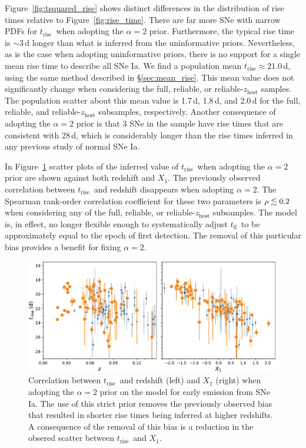 \documentclass[twocolumn]{./aastex63}
\newcommand{\tfl}{$t_\mathrm{fl}$}
\newcommand{\trise}{$t_\mathrm{rise}$}
\begin{document}
Figure~\ref{fig:tsquared_rise} shows distinct differences in the distribution of
rise times relative to Figure~\ref{fig:rise_time}. There are far more SNe with
narrow PDFs for \trise\ when adopting the $\alpha = 2$ prior. Furthermore, the
typical rise time is $\sim$3\,d longer than what is inferred from the
uninformative priors. Nevertheless, as is the case when adopting uninformative
priors, there is no support for a single mean rise time to describe all SNe Ia.
We find a population mean \trise\;$\approx 21.0$\,d, using the same method
described in \S\ref{sec:mean_rise}. This mean value does not significantly
change when considering the full, reliable, or reliable-$z_\mathrm{host}$
samples. The population scatter about this mean value is 1.7\,d, 1.8\,d, and
2.0\,d for the full, reliable, and reliable-$z_\mathrm{host}$ subsamples,
respectively. Another consequence of adopting the $\alpha = 2$ prior is that 3
SNe in the sample have rise times that are consistent with 28\,d, which is
considerably longer than the rise times inferred in any previous study of normal
SNe Ia.

In Figure~\ref{fig:tsquared_z_evolution} scatter plots of the inferred value of
\trise\ when adopting the $\alpha = 2$ prior are shown against both redshift and
$X_1$. The previously observed correlation between \trise\ and redshift
disappears when adopting $\alpha = 2$. The Spearman rank-order correlation
coefficient for these two parameters is $\rho \lesssim 0.2$ when considering any of
the full, reliable, or reliable-$z_\mathrm{host}$ subsamples. The model is, in
effect, no longer flexible enough to systematically adjust \tfl\ to be
approximately equal to the epoch of first detection. The removal of this
particular bias provides a benefit for fixing $\alpha = 2$.

\begin{figure}
    \centering
    \includegraphics[width=6in]{./figures/trise_z_tsquared.pdf}
    \caption{Correlation between \trise\ and redshift (left) and $X_1$ (right)
    when adopting the $\alpha = 2$ prior on the model for early emission from
    SNe Ia. The use of this strict prior removes the previously observed bias
    that resulted in shorter rise times being inferred at higher redshifts. A
    consequence of the removal of this bias is a reduction in the obsered
    scatter between \trise\ and $X_1$.}
    \label{fig:tsquared_z_evolution}
\end{figure}
\end{document}
